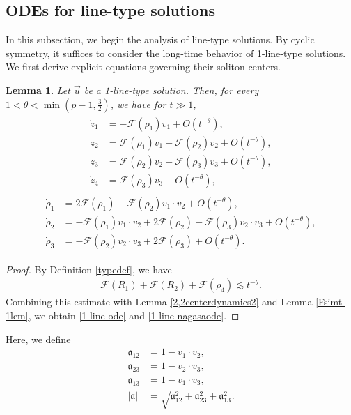 \documentclass[reqno]{amsart}
\theoremstyle{plain}
\newtheorem{lemma}[theorem]{Lemma}
\theoremstyle{definition}
\numberwithin{equation}{section}
\begin{document}
\subsection{ODEs for line-type solutions}

In this subsection, we begin the analysis of line-type solutions. By cyclic symmetry, it suffices to consider the long-time behavior of 1-line-type solutions. We first derive explicit equations governing their soliton centers.


\begin{lemma}\label{1-type-ode}
Let $\vec{u}$ be a 1-line-type solution. Then, for every $1<\theta<\min{(p-1,\frac{3}{2})}$, we have for $t\gg 1$,
\begin{align}\label{1-line-ode}
\begin{aligned}
\dot{z}_1&=-\mathcal{F}(\rho_1)v_1+O\left(t^{-\theta}\right),
\\
\dot{z}_2&=\mathcal{F}(\rho_1)v_1-\mathcal{F}(\rho_2)v_2+O\left(t^{-\theta}\right),
\\
\dot{z}_3&=\mathcal{F}(\rho_2)v_2-\mathcal{F}(\rho_3)v_3+O\left(t^{-\theta}\right),
\\
\dot{z}_4&=\mathcal{F}(\rho_3)v_3+O\left(t^{-\theta}\right),
\end{aligned}
\end{align}
\begin{align}\label{1-line-nagasaode}
\begin{aligned}
\dot{\rho}_1&=2\mathcal{F}(\rho_1)-\mathcal{F}(\rho_2)v_1\cdot v_2+O\left(t^{-\theta}\right),
\\
\dot{\rho}_2&=-\mathcal{F}(\rho_1)v_1\cdot v_2+2\mathcal{F}(\rho_2)-\mathcal{F}(\rho_3)v_2\cdot v_3+O\left(t^{-\theta}\right),
\\
\dot{\rho}_3&=-\mathcal{F}(\rho_2)v_2\cdot v_3+2\mathcal{F}(\rho_3)+O\left(t^{-\theta}\right).
\end{aligned}
\end{align}
\end{lemma}
\begin{proof}
By Definition \ref{typedef}, we have
\begin{align*}
\mathcal{F}(R_1)+\mathcal{F}(R_2)+\mathcal{F}(\rho_4)\lesssim t^{-\theta}.
\end{align*}
Combining this estimate with Lemma \ref{2,2centerdynamics2} and Lemma \ref{Fsimt-1lem}, we obtain \eqref{1-line-ode} and \eqref{1-line-nagasaode}.
\end{proof}

Here, we define 
\begin{align*}
\mathfrak{a}_{12}&=1-v_1\cdot v_2,
\\
\mathfrak{a}_{23}&=1-v_2\cdot v_3,
\\
\mathfrak{a}_{13}&=1-v_1\cdot v_3,
\\
|\mathfrak{a}|&=\sqrt{\mathfrak{a}_{12}^2+\mathfrak{a}_{23}^2+\mathfrak{a}_{13}^2}.
\end{align*}
\end{document}
